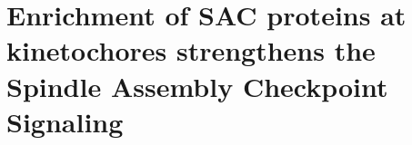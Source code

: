 \chapter{Enrichment of SAC proteins at kinetochores strengthens the Spindle Assembly Checkpoint Signaling}
\label{chpt:3}